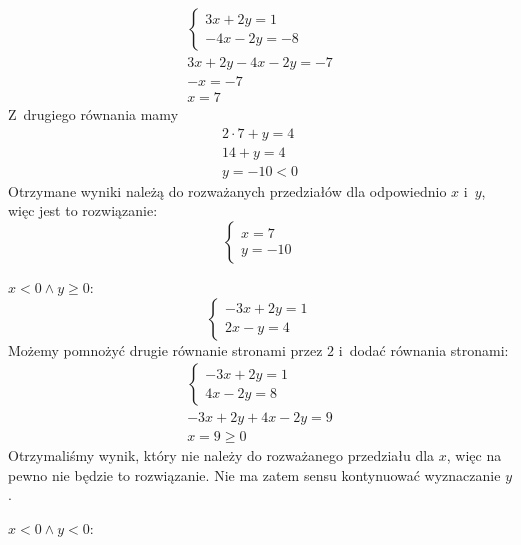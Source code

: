 \begin{proofcases}
        \begin{gather*}
            \begin{cases}
                3x + 2y = 1\\
                -4x - 2y = -8
            \end{cases}\\
            3x + 2y - 4x - 2y = -7\\
            -x = -7\\
            x = 7
        \end{gather*}
        Z~drugiego równania mamy
        \begin{gather*}
            2 \cdot 7 + y = 4\\
            14 + y = 4\\
            y = -10 < 0
        \end{gather*}
        Otrzymane wyniki należą do rozważanych przedziałów dla odpowiednio \(x\) i~\(y\), więc jest to rozwiązanie:
        \begin{equation*}
            \begin{cases}
                x = 7\\
                y = -10
            \end{cases}
        \end{equation*}
    \item \(x < 0 \land y \geq 0\):
        \begin{equation*}
            \begin{cases}
                -3x + 2y = 1\\
                2x - y = 4
            \end{cases}
        \end{equation*}
        Możemy pomnożyć drugie równanie stronami przez \(2\) i~dodać równania stronami:
        \begin{gather*}
            \begin{cases}
                -3x + 2y = 1\\
                4x - 2y = 8
            \end{cases}\\
            -3x + 2y + 4x - 2y = 9\\
            x = 9 \geq 0
        \end{gather*}
        Otrzymaliśmy wynik, który nie należy do rozważanego przedziału dla \(x\), więc na pewno nie będzie to rozwiązanie. Nie ma zatem sensu kontynuować wyznaczanie \(y\).
    \item \(x < 0 \land y < 0\):

\end{proofcases}
